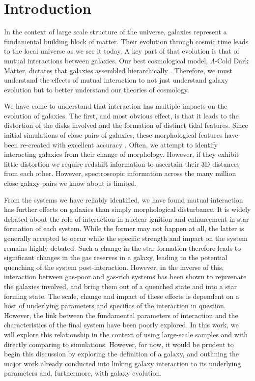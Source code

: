 \chapter{Introduction}\label{chapter:introduction}
In the context of large scale structure of the universe, galaxies represent a fundamental building block of matter. Their evolution through cosmic time \citep{2005Natur.435..629S} leads to the local universe as we see it today. A key part of that evolution is that of mutual interactions between galaxies. Our best cosmological model, $\Lambda$-Cold Dark Matter, dictates that galaxies assembled hierarchically \citep{1978MNRAS.183..341W, 1991ApJ...379...52W}. Therefore, we must understand the effects of mutual interaction to not just understand galaxy evolution but to better understand our theories of cosmology.

We have come to understand that interaction has multiple impacts on the evolution of galaxies. The first, and most obvious effect, is that it leads to the distortion of the disks involved and the formation of distinct tidal features. Since initial simulations of close pairs of galaxies, these morphological features have been re-created with excellent accuracy \citep{1972ApJ...178..623T}. Often, we attempt to identify interacting galaxies from their change of morphology. However, if they exhibit little distortion we require redshift information to ascertain their 3D distances from each other. However, spectroscopic information across the many million close galaxy pairs we know about is limited.

From the systems we have reliably identified, we have found mutual interaction has further effects on galaxies than simply morphological disturbance. It is widely debated about the role of interaction in nuclear ignition and enhancement in star formation of each system. While the former may not happen at all, the latter is generally accepted to occur while the specific strength and impact on the system remains highly debated. Such a change in the star formation therefore leads to significant changes in the gas reserves in a galaxy, leading to the potential quenching of the system post-interaction. However, in the inverse of this, interaction between gas-poor and gas-rich systems has been shown to rejuvenate the galaxies involved, and bring them out of a quenched state and into a star forming state. The scale, change and impact of these effects is dependent on a host of underlying parameters and specifics of the interaction in question. However, the link between the fundamental parameters of interaction and the characteristics of the final system have been poorly explored. In this work, we will explore this relationship in the context of using large-scale samples and with directly comparing to simulations. However, for now, it would be prudent to begin this discussion by exploring the definition of  a galaxy, and outlining the major work already conducted into linking galaxy interaction to its underlying parameters and, furthermore, with galaxy evolution.

